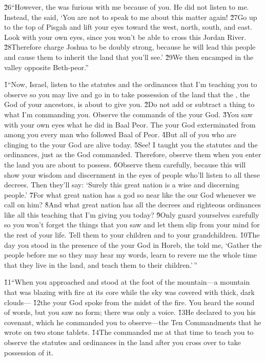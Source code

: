 \v{26}``However, the  was furious with me because of you. He did not listen to me. Instead, the  said, `You are not to speak to me about this matter again! \v{27}Go up to the top of Pisgah and lift your eyes toward the west, north, south, and east. Look with your own eyes, since you won't be able to cross this Jordan River. \v{28}Therefore charge Joshua to be doubly strong, because he will lead this people and cause them to inherit the land that you'll see.' \v{29}We then encamped in the valley opposite Beth-peor.''

\v{1}``Now, Israel, listen to the statutes and the ordinances that I'm teaching you to observe so you may live and go in to take possession of the land that the , the God of your ancestors, is about to give you. \v{2}Do not add or subtract a thing to what I'm commanding you. Observe the commands of the  your God. \v{3}You saw with your own eyes what he did in Baal Peor. The  your God exterminated from among you every man who followed Baal of Peor. \v{4}But all of you who are clinging to the  your God are alive today. \v{5}See! I taught you the statutes and the ordinances, just as the  God commanded. Therefore, observe them when you enter the land you are about to possess. \v{6}Observe them carefully, because this will show your wisdom and discernment in the eyes of people who'll listen to all these decrees. Then they'll say: `Surely this great nation is a wise and discerning people.' \v{7}For what great nation has a god so near like the  our God whenever we call on him? \v{8}And what great nation has all the decrees and righteous ordinances like all this teaching that I'm giving you today? \v{9}Only guard yourselves carefully so you won't forget the things that you saw and let them slip from your mind for the rest of your life. Tell them to your children and to your grandchildren. \v{10}The day you stood in the presence of the  your God in Horeb, the  told me, `Gather the people before me so they may hear my words, learn to revere me the whole time that they live in the land, and teach them to their children.'\,''

\v{11}``When you approached and stood at the foot of the mountain---a mountain that was blazing with fire at its core while the sky was covered with thick, dark clouds--- \v{12}the  your God spoke from the midst of the fire. You heard the sound of words, but you saw no form; there was only a voice. \v{13}He declared to you his covenant, which he commanded you to observe---the Ten Commandments that he wrote on two stone tablets. \v{14}The  commanded me at that time to teach you to observe the statutes and ordinances in the land after you cross over to take possession of it.

